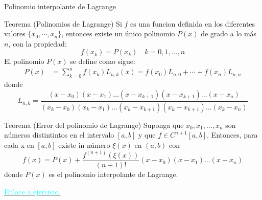 \label{RetornoPolinomioLagrange}
\begin{frame}{Polinomio interpolante de Lagrange}
\begin{block}{Teorema (Polinomios de Lagrange)}
\indent Si $f$ es una funcion definida en los diferentes valores $\{x_0,\cdots, x_n\}$, entonces existe un único polinomio $P(x)$ de grado a lo más $n$, con la propiedad:
$$f(x_k)=P(x_k)\quad k=0, 1, \dots, n$$
El polinomio $P(x)$ se define como sigue:
\begin{align*}
P(x)&=\sum_{k=0}^{n}f(x_k)L_{n,k}(x)=f(x_0)L_{n,0}+\cdots+f(x_n)L_{n,n}
\end{align*}
donde
$$L_{n,k}=\frac{(x-x_0)(x-x_1)\dots(x-x_{k+1})(x-x_{k+1})\dots (x-x_n)}{(x_k-x_0)(x_k-x_1)\dots(x_k-x_{k+1})(x_k-x_{k+1})\dots (x_k-x_n)}$$
\end{block}
\end{frame}
\begin{frame}
\begin{block}{Teorema (Error del polinomio de Lagrange)}
Suponga que $x_0, x_1, \dots, x_n$ son números distintintos en el intervalo $[a,b]$ y que $f \in C^{n+1}[a,b]$. Entonces, para cada x en $[a,b]$ existe in número $\xi(x)$ en $(a,b)$ con 
$$f(x)=P(x)+\frac{f^{(n+1)}(\xi(x))}{(n+1)!}(x-x_0)(x-x_1)\dots (x-x_n)$$
donde $P(x)$ es el polinomio interpolante de Lagrange.
\end{block}
\hyperlink{PolinomioLagrange}{\textcolor{cyan}{Enlace a ejercicio.}}
\end{frame}
